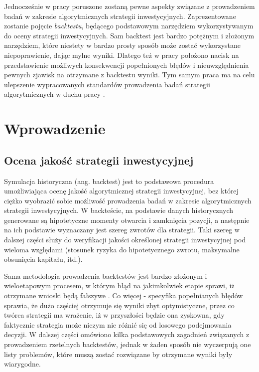 \documentclass[a4paper,12pt,openany, DIV=calc, headsepline]{scrbook}
\begin{document}
Jednocześnie w pracy poruszone zostaną pewne aspekty związane z prowadzeniem badań w zakresie algorytmicznych strategii inwestycyjnych. Zaprezentowane zostanie pojęcie \emph{backtestu}, będącego podstawowym narzędziem wykorzystywanym do oceny strategii inwestycyjnych. Sam backtest jest bardzo potężnym i złożonym narzędziem, które niestety w bardzo prosty sposób może zostać wykorzystane niepoprawienie, dając mylne wyniki. Dlatego też w pracy położono nacisk na przedstawienie możliwych konsekwencji popełnionych błędów i nieuwzględnienia pewnych zjawisk na otrzymane z backtestu wyniki. Tym samym praca ma na celu ulepszenie wypracowanych standardów prowadzenia badań strategii algorytmicznych w duchu pracy \citep{de2015future}.


\chapter{Wprowadzenie}

\section{Ocena jakość strategii inwestycyjnej}

Symulacja historyczna (ang. backtest) jest to  podstawowa procedura umożliwiająca ocenę jakość algorytmicznej strategii inwestycyjnej, bez której ciężko wyobrazić sobie możliwość prowadzenia badań w zakresie algorytmicznych strategii inwestycyjnych. W backteście, na podstawie danych historycznych generowane są hipotetyczne momenty otwarcia i zamknięcia pozycji, a następnie na ich podstawie wyznaczany jest szereg zwrotów dla strategii. Taki szereg w dalszej części służy do weryfikacji jakości określonej strategii inwestycyjnej pod wieloma względami (stosunek ryzyka do hipotetycznego zwrotu, maksymalne obsunięcia kapitału, itd.). 

Sama metodologia prowadzenia backtestów jest bardzo złożonym i wieloetapowym procesem, w którym błąd na jakimkolwiek etapie sprawi, iż otrzymane wnioski będą fałszywe . Co więcej - specyfika popełnianych błędów sprawia, że dużo częściej otrzymuje się wyniki zbyt optymistyczne, przez co twórca strategii ma wrażenie, iż w przyszłości będzie ona zyskowna, gdy faktycznie strategia może niczym nie różnić się od losowego podejmowania decyzji. W dalszej części omówiono kilka podstawowych zagadnień związanych z prowadzeniem rzetelnych backtestów, jednak w żaden sposób nie wyczerpują one listy problemów, które muszą zostać rozwiązane by otrzymane wyniki były wiarygodne.
\end{document}
